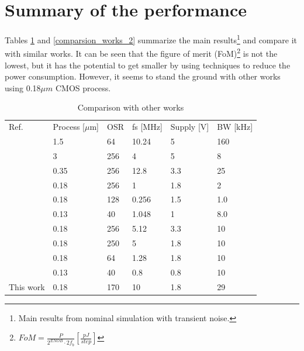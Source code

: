 \section{Summary of the performance }
Tables \ref{comparsion_works} and \ref{comparsion_works_2} summarize the main results\footnote{Main results from nominal simulation with transient noise.} and compare it with similar works. It can be seen that the figure of merit (FoM)\footnote{$FoM = \frac{P}{2^{ENOB}\cdot2f_b}[\frac{pJ}{step}]$} is not the lowest, but it has the potential to get smaller by using techniques to reduce the power consumption. However, it seems to stand the ground with other works using 0.18$\mu m$ CMOS process. 


\begin{table}[H]
\centering
\caption{Comparison with other works}
\label{comparsion_works}
\begin{tabular}{l|l|l|l|l|l}
\hline
\multirow{1}{*}{Ref.} & \multicolumn{1}{c|}{Process [$\mu$m]} & \multicolumn{1}{c|}{OSR} & \multicolumn{1}{c|}{fs [MHz]} & \multicolumn{1}{c|}{Supply [V]} & \multicolumn{1}{c}{BW [kHz]}  \\\cline{1-6}

            \cite{ref_1} & 1.5 & 64 & 10.24 & 5 & 160\\
            \cite{ref_2} & 3 & 256 & 4 & 5 & 8\\
            \cite{ref_3} & 0.35 & 256 & 12.8 & 3.3 & 25\\
            \cite{SQNR} & 0.18 & 256 & 1 & 1.8 & 2 \\
            \cite{ref_4} & 0.18 & 128 & 0.256 & 1.5 & 1.0\\ 
            \cite{ref_5} & 0.13 & 40 & 1.048 & 1 & 8.0 \\
            \cite{ref_6} & 0.18 & 256 & 5.12 & 3.3 & 10\\
            \cite{ref_7} & 0.18 & 250 & 5 & 1.8 & 10\\
            \cite{ref_8} & 0.18 & 64 & 1.28 & 1.8 & 10\\
            \cite{ref_9} & 0.13 & 40 & 0.8& 0.8& 10 \\
            This work & 0.18 & 170 & 10 & 1.8 & 29\\

\hline            
\end{tabular}
\end{table}


